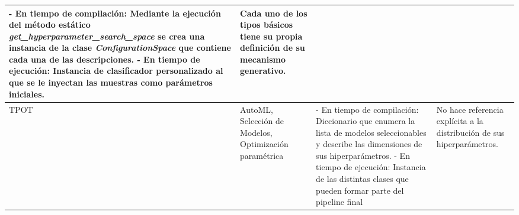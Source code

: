 \begin{longtable}{  p{2.5cm}  p{4cm}  p{6.8cm}  p{6.5cm} }
    - En tiempo de compilación: Mediante la ejecución del método estático {\it get\_hyperparameter\_search\_space} se crea una instancia de la clase  {\it ConfigurationSpace} que contiene cada una de las descripciones. \newline- En tiempo de ejecución: Instancia de clasificador personalizado al que se le inyectan las muestras como parámetros iniciales. &
    Cada uno de los tipos básicos tiene su propia definición de su mecanismo generativo.                                                                                                                                                                                                                                                                             \\
    \hline
    TPOT                                                                                                                                                                                                                                                                                                                                                          &
    AutoML, Selección de Modelos, Optimización paramétrica                                                                                                                                                                                                                                                                                                        &
    - En tiempo de compilación: Diccionario que enumera la lista de modelos seleccionables y describe las dimensiones de sus hiperparámetros. \newline- En tiempo de ejecución: Instancia de las distintas clases que pueden formar parte del pipeline final                                                                                                      &
    No hace referencia explícita a la distribución de sus hiperparámetros.                                                                                                                                                                                                                                                                                           \\

\end{longtable}
